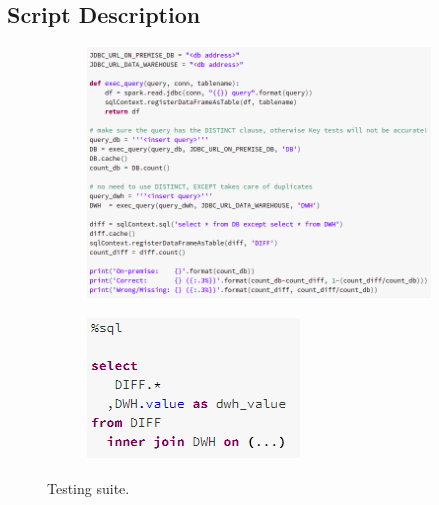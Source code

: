 \subsection{Script Description}
    \begin{figure}
        \centering
        \begin{subfigure}{\textwidth}
            \includegraphics[width=\textwidth]{res/tests/test_suite.png}
        \end{subfigure}
        
        \begin{subfigure}{.3\textwidth}
            \includegraphics[width=\textwidth]{res/tests/test_suite_sql.png}
            \label{fig:tests:data:suite:sql}
        \end{subfigure}
        
        \caption{Testing suite.}
        \label{fig:tests:data:suite}
    \end{figure}

